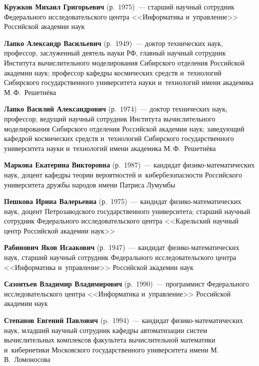 \begin{multicols}{2}
 
 \columnbreak

\noindent
\textbf{Кружков Михаил Григорьевич} (р.\ 1975)~--- 
старший научный сотрудник Федерального исследовательского цент\-ра <<Информатика и~управ\-ле\-ние>> Российской академии наук

\noindent
\textbf{Лапко Александр Васильевич} (р.\ 1949)~--- 
доктор технических наук, профессор, заслуженный деятель науки РФ, главный научный сотрудник Института вычислительного моделирования 
Сибирского отделения Российской академии наук; 
профессор ка\-фед\-ры космических средств и~технологий Сибирского государственного университета науки и~технологий имени академика М.\,Ф.~Решетнёва

\noindent
\textbf{Лапко Василий Александрович} (р.\ 1974)~--- 
доктор технических наук, профессор, ведущий научный сотрудник Института вычислительного моделирования 
Сибирского отделения Российской академии наук; за\-ве\-ду\-ющий ка\-фед\-рой космических средств и~технологий Сибирского государственного университета науки 
и~технологий имени академика М.\,Ф.~Решетнёва

\noindent
\textbf{Маркова Екатерина Викторовна} (р.\ 1987)~--- кандидат фи\-зи\-ко-ма\-те\-ма\-ти\-че\-ских наук, 
доцент ка\-фед\-ры тео\-рии вероятностей и~ки\-бер\-безопас\-ности Российского университета друж\-бы народов имени Патриса Лумумбы

\noindent
\textbf{Пешкова Ирина Валерьевна} (р.\ 1975)~--- кандидат фи\-зи\-ко-ма\-те\-ма\-ти\-че\-ских наук, 
доцент Петрозаводского государственного университета; старший научный сотрудник 
Федерального исследовательского цент\-ра <<Карельский научный центр Российской академии наук>>

\noindent
\textbf{Рабинович Яков Исаакович} (р.\ 1947)~--- кандидат фи\-зи\-ко-ма\-те\-ма\-ти\-че\-ских наук, 
старший научный сотрудник Федерального исследовательского цент\-ра <<Информатика и~управ\-ле\-ние>> Российской академии наук

\noindent
\textbf{Сазонтьев Владимир Владимирович} (р.\ 1990)~--- 
программист Федерального исследовательского цент\-ра <<Информатика и~управ\-ле\-ние>> Российской академии наук 

\pagebreak

\noindent
\textbf{Степанов Евгений Павлович} (p.\ 1994)~--- кандидат фи\-зи\-ко-ма\-те\-ма\-ти\-че\-ских
наук, младший научный сотрудник ка\-фед\-ры автоматизации сис\-тем
вы\-чис\-ли\-тель\-ных комплексов факультета вы\-чис\-ли\-тель\-ной математики и~кибернетики Московского {государственного} 
университета имени М.\,В.~Ломоносова
{

}
\end{multicols}
